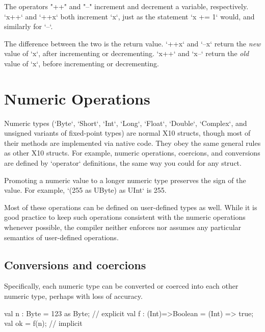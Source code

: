 The operators \xcd"++" and \xcd"--" increment and decrement
a variable, respectively.  
\xcd`x++` and \xcd`++x` both increment \xcd`x`, just as the statement 
\xcd`x += 1` would, and similarly for \xcd`--`.  

The difference between the two is the return value.  
\xcd`++x` and \xcd`--x` return the {\em new} value of \xcd`x`, after
incrementing or decrementing.
\xcd`x++` and \xcd`x--` return the {\em old} value of \xcd`x`, before
incrementing or decrementing.



\section{Numeric Operations}
\label{XtenPromotions}

Numeric types (\xcd`Byte`, \xcd`Short`, \xcd`Int`, \xcd`Long`, \xcd`Float`,
\xcd`Double`, \xcd`Complex`, and unsigned variants of fixed-point types) are normal X10
structs, though most of their methods are implemented via native code. They
obey the same general rules as other X10 structs. For example, numeric
operations, coercions, and conversions are defined by \xcd`operator` definitions, the same way you could
for any struct.

Promoting a numeric value to a longer numeric type preserves the sign of the
value.  For example, \xcd`(255 as UByte) as UInt` is 255. 

Most of these operations can be defined on user-defined types as well.  While
it is good practice to keep such operations consistent with the numeric
operations whenever possible, the compiler neither enforces nor assumes any
particular semantics of user-defined operations. 

\subsection{Conversions and coercions}

Specifically, each numeric type can be converted or coerced into each other
numeric type, perhaps with loss of accuracy.
\begin{xten}
val n : Byte = 123 as Byte; // explicit 
val f : (Int)=>Boolean = (Int) => true; 
val ok = f(n); // implicit
\end{xten}



